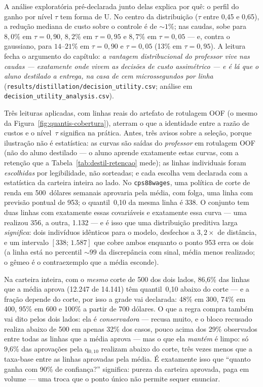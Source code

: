 A análise exploratória pré-declarada junto delas explica por quê: o perfil
do ganho por nível $\tau$ tem forma de U. No centro da distribuição
($\tau$ entre 0,45 e 0,65), a redução mediana de custo sobre o
controle é de ${\sim}1\%$; nas caudas, sobe para $8{,}0\%$ em
$\tau{=}0{,}90$, $8{,}2\%$ em $\tau{=}0{,}95$ e $8{,}7\%$ em
$\tau{=}0{,}05$ --- e, contra o gaussiano, para $14$--$21\%$ em
$\tau{=}0{,}90$ e $\tau{=}0{,}05$ (13\% em $\tau{=}0{,}95$). A leitura fecha o argumento do capítulo: \emph{a
vantagem distribucional do professor vive nas caudas --- exatamente
onde vivem as decisões de custo assimétrico --- e é lá que o aluno
destilado a entrega, na casa de cem microssegundos por linha}
(\texttt{results/\allowbreak distillation/\allowbreak decision\_\allowbreak utility.\allowbreak csv};
análise em \texttt{decision\_\allowbreak utility\_\allowbreak analysis.\allowbreak csv}).

Três leituras aplicadas, com linhas reais do artefato de rotulagem OOF
(o mesmo da Figura~\ref{fig:quantis-cobertura}), aterram o que a
identidade entre a razão de custos e o nível~$\tau$ significa na
prática. Antes, três avisos sobre a seleção, porque ilustração não é
estatística: as curvas são saídas do \emph{professor} em rotulagem
OOF (não do aluno destilado --- o aluno aprende exatamente estas
curvas, com a retenção que a Tabela~\ref{tab:destil-retencao} mede);
as linhas individuais foram \emph{escolhidas} por legibilidade, não
sorteadas; e cada escolha vem declarada com a estatística da carteira
inteira ao lado. No \texttt{cps88wages}, uma política de corte de
renda em 500~dólares semanais aprovaria pela média, com folga, uma
linha com previsão pontual de 953; o quantil~0,10 da mesma linha é
338. O conjunto tem duas linhas com exatamente essas covariáveis e
exatamente essa curva --- uma realizou 356, a outra, 1.132 --- e é
isso que uma distribuição preditiva larga \emph{significa}: dois
indivíduos idênticos para o modelo, desfechos a $3{,}2\times$ de
distância, e um intervalo $[338;\,1.587]$ que cobre ambos enquanto o
ponto 953 erra os dois (a linha está no percentil ${\sim}99$ da
discrepância com sinal, média menos realizado; o gêmeo é o
contraexemplo que a média
esconde).

Na carteira inteira, com o \emph{mesmo} corte de 500 dos
dois lados, 86,6\% das linhas que a média aprova (12.247 de 14.141)
têm quantil~0,10 abaixo do corte --- e a fração depende do corte, por
isso a grade vai declarada: 48\% em 300, 74\% em 400, 95\% em 600 e
100\% a partir de 700 dólares. O que a regra compra também vai dito
pelos dois lados: ela é \emph{conservadora} --- recusa muito, e o
bloco recusado realiza abaixo de 500 em apenas 32\% dos casos, pouco
acima dos 29\% observados entre todas as linhas que a média aprova
--- mas o que ela \emph{mantém} é
limpo: só 9,6\% das aprovações pela q$_{0,10}$ realizam abaixo do
corte, três vezes menos que a taxa-base entre as linhas aprovadas
pela média. É exatamente isso que ``quanto
ganha com 90\% de confiança?'' significa: pureza da carteira aprovada,
paga em volume --- uma troca que o ponto único não permite sequer
enunciar.

